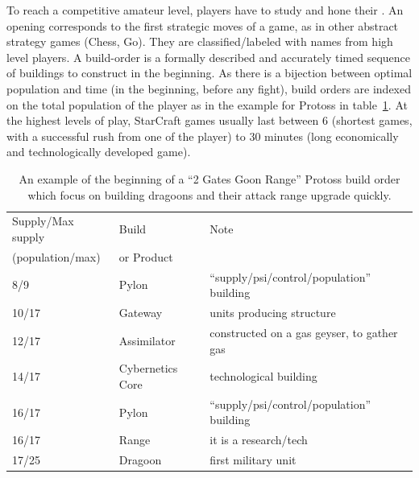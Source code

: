 To reach a competitive amateur level, players have to study \textit{} and hone their \textit{}. An opening corresponds to the first strategic moves of a game, as in other abstract strategy games (Chess, Go). They are classified/labeled with names from high level players. A build-order is a formally described and accurately timed sequence of buildings to construct in the beginning. As there is a bijection between optimal population and time (in the beginning, before any fight), build orders are indexed on the total population of the player as in the example for Protoss in table~\ref{bo:two_gates_goon_range}. 
At the highest levels of play, StarCraft games usually last between 6 (shortest games, with a successful rush from one of the player) to 30 minutes (long economically and technologically developed game).
\begin{table}[ht]
\begin{center}
\begin{tabular}{|l|l|l|}
\hline
Supply/Max supply & Build & Note \\
(population/max) & or Product & \\
\hline
8/9 & Pylon & ``supply/psi/control/population'' building \\
10/17 & Gateway & units producing structure \\
12/17 & Assimilator & constructed on a gas geyser, to gather gas \\
14/17 & Cybernetics Core & technological building \\
16/17 & Pylon & ``supply/psi/control/population'' building \\
16/17 & Range & it is a research/tech \\
17/25 & Dragoon & first military unit \\
\hline
\end{tabular}
\end{center}
\caption{An example of the beginning of a ``2 Gates Goon Range'' Protoss build order which focus on building dragoons and their attack range upgrade quickly.}
\label{bo:two_gates_goon_range}
\end{table}

